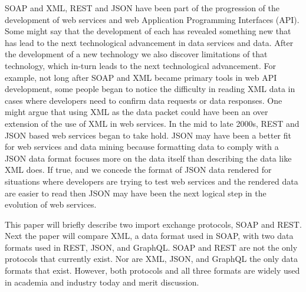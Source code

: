 SOAP and XML, REST and JSON have been part of the progression of the development
of web services and web Application Programming Interfaces (API).  Some might 
say that the development of each has revealed something new that has lead to 
the next technological advancement in data services and data.  After the 
development of a new technology we also discover limitations of that 
technology, which in-turn leads to the next technological advancement.  For 
example, not long after SOAP and XML became primary tools in web API 
development, some people began to notice the difficulty in reading XML data in 
cases where developers need to confirm data requests or data responses.  One 
might argue that using XML as the data packet could have been an over extension 
of the use of XML in web services.  In the mid to late 2000s, REST and JSON 
based web services began to take hold.  JSON may have been a better fit for 
web services and data mining because formatting data to comply with a JSON 
data format focuses more on the data itself than describing the data like XML 
does.  If true, and we concede the format of JSON data rendered for situations 
where developers are trying to test web services and the rendered data are 
easier to read then JSON may have been the next logical step in the evolution 
of web services.  

This paper will briefly describe two import exchange protocols, SOAP and REST.  
Next the paper will compare XML, a data format used in SOAP, with two data
formats used in REST, JSON, and GraphQL.  SOAP and REST are not the only
protocols that currently exist.  Nor are XML, JSON, and GraphQL the only data
formats that exist.  However, both protocols and all three formats are widely
used in academia and industry today and merit discussion.  

